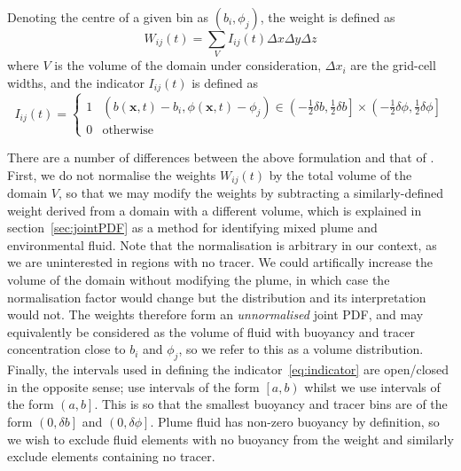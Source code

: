 \documentclass[a4paper]{article}
\begin{document}
Denoting the centre of a given bin as $(b_i, \phi_j)$, the weight is defined as
\begin{equation}
	W_{ij}(t) = \sum_V I_{ij}(t) \Delta x \Delta y \Delta z
\end{equation}
where $V$ is the volume of the domain under consideration, $\Delta x_i$ are the grid-cell widths, and the
indicator $I_{ij}(t)$ is defined as
\begin{equation}
	I_{ij}(t) = \begin{cases}
		1 & \left(b(\bm{x},t) - b_i, \phi(\bm{x},t) - \phi_j\right) \in \left( -\frac{1}{2}\delta b,
		\frac{1}{2}\delta b \right] \times \left( -\frac{1}{2}\delta \phi, \frac{1}{2}\delta \phi \right] \\
			0 & \text{otherwise}
		\end{cases}
		\label{eq:indicator}
\end{equation}

There are a number of differences between the above formulation and that of \citet{penney2020}. First, we do
not normalise the weights $W_{ij}(t)$ by the total volume of the domain $V$, so that we may modify the weights
by subtracting a similarly-defined weight derived from a domain with a different volume, which is explained in
section~\ref{sec:jointPDF} as a method for identifying mixed plume and environmental fluid. Note that the
normalisation is arbitrary in our context, as we are uninterested in regions with no tracer. We could
artifically increase the volume of the domain without modifying the plume, in which case the normalisation
factor would change but the distribution and its interpretation would not. The weights therefore form an
\emph{unnormalised} joint PDF, and may equivalently be considered as the volume of fluid with buoyancy and
tracer concentration close to $b_i$ and $\phi_j$, so we refer to this as a volume distribution. Finally, the
intervals used in defining the indicator~\eqref{eq:indicator} are open/closed in the opposite sense;
\citet{penney2020} use intervals of the form $\left[a, b\right)$ whilst we use intervals of the form $\left(a,
b\right]$. This is so that the smallest buoyancy and tracer bins are of the form $\left(0, \delta b\right]$
and $\left(0, \delta \phi\right]$. Plume fluid has non-zero buoyancy by definition, so we wish to exclude
fluid elements with no buoyancy from the weight and similarly exclude elements containing no tracer.
\end{document}
